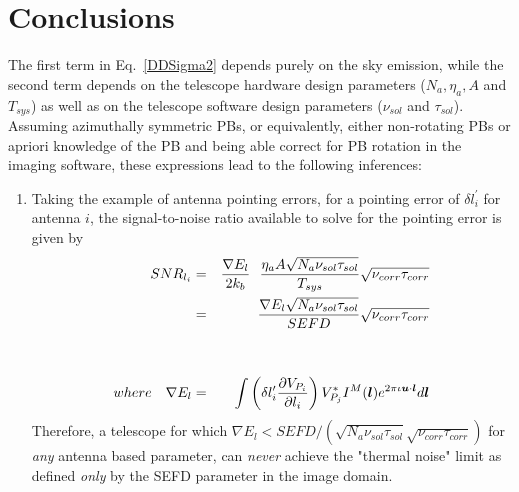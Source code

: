 \documentclass[11pt]{article}
\def\vec#1{\ensuremath{\mathchoice{\mbox{\boldmath$\displaystyle#1$}}
{\mbox{\boldmath$\textstyle#1$}}
{\mbox{\boldmath$\scriptstyle#1$}}
{\mbox{\boldmath$\scriptscriptstyle#1$}}}}
\begin{document}
\section{Conclusions}
The first term in Eq.~\ref{DDSigma2} depends purely on the sky
emission, while the second term depends on the telescope hardware
design parameters ($N_a, \eta_a, A$ and $T_{sys}$) as well as on the
telescope software design parameters ($\nu_{sol}$ and $\tau_{sol}$).
Assuming azimuthally symmetric PBs, or equivalently, either
non-rotating PBs or apriori knowledge of the PB and being able correct
for PB rotation in the imaging software, these expressions lead to the
following inferences:
\begin{enumerate}
\item Taking the example of antenna pointing errors, for a pointing
  error of $\delta l^\prime_i$ for antenna $i$, the signal-to-noise ratio
  available to solve for the pointing error is given by
\begin{eqnarray}
  SNR_{l_i} &=& \frac{\nabla E_l}{2 k_b}~~ \frac{\eta_a
    A \sqrt{N_a \nu_{sol} \tau_{sol}}}{T_{sys}}\sqrt{\nu_{corr}\tau_{corr}}\\ 
  &=& \frac{\nabla E_l \sqrt{N_a\nu_{sol}\tau_{sol}}}{SEFD}\sqrt{\nu_{corr}\tau_{corr}}\\\nonumber
  \\ \nonumber
  \\ 
  \label{DELTA-E}
  where~~~\nabla E_l &=& \int \left(\delta l^\prime_i \frac{\partial
      V_{P_i}}{\partial l_i}\right) V^*_{P_j} I^M(\vec{l}) e^{2\pi
    \iota \vec{u}\cdot \vec{l}} d\vec{l}
\end{eqnarray}
Therefore, a telescope for which $\nabla E_l < SEFD/\left(\sqrt{N_a\nu_{sol}\tau_{sol}}\sqrt{\nu_{corr}\tau_{corr}}\right)$ for
{\it any} antenna based parameter, can {\it never} achieve the
"thermal noise" limit as defined {\it only} by the SEFD parameter in
the image domain.


\end{enumerate}
\end{document}
